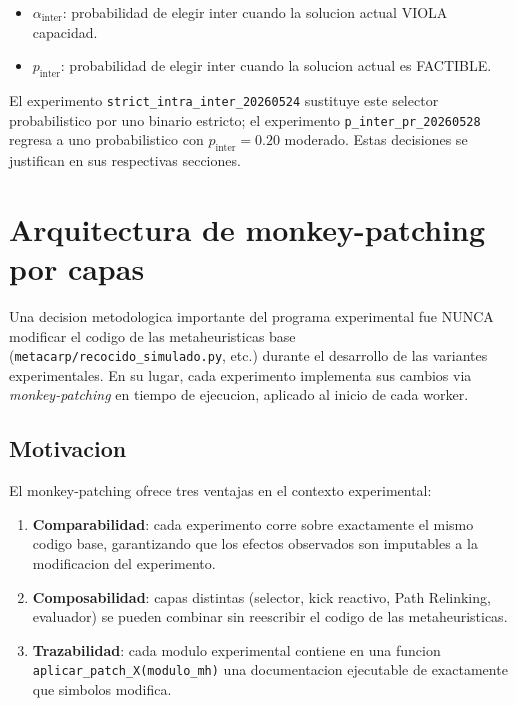 \begin{itemize}
\item $\alpha_{\text{inter}}$: probabilidad de elegir inter cuando la
  solucion actual VIOLA capacidad.
\item $p_{\text{inter}}$: probabilidad de elegir inter cuando la
  solucion actual es FACTIBLE.
\end{itemize}

El experimento \texttt{strict\_intra\_inter\_20260524} sustituye este
selector probabilistico por uno binario estricto; el experimento
\texttt{p\_inter\_pr\_20260528} regresa a uno probabilistico con
$p_{\text{inter}} = 0.20$ moderado. Estas decisiones se justifican en
sus respectivas secciones.

\section{Arquitectura de monkey-patching por capas}
\label{sec:arquitectura-software}

Una decision metodologica importante del programa experimental fue
NUNCA modificar el codigo de las metaheuristicas base
(\texttt{metacarp/recocido\_simulado.py}, etc.) durante el desarrollo
de las variantes experimentales. En su lugar, cada experimento
implementa sus cambios via \emph{monkey-patching} en tiempo de
ejecucion, aplicado al inicio de cada worker.

\subsection{Motivacion}

El monkey-patching ofrece tres ventajas en el contexto experimental:

\begin{enumerate}
\item \textbf{Comparabilidad}: cada experimento corre sobre exactamente
  el mismo codigo base, garantizando que los efectos observados son
  imputables a la modificacion del experimento.
\item \textbf{Composabilidad}: capas distintas (selector, kick reactivo,
  Path Relinking, evaluador) se pueden combinar sin reescribir el
  codigo de las metaheuristicas.
\item \textbf{Trazabilidad}: cada modulo experimental contiene en una
  funcion \texttt{aplicar\_patch\_X(modulo\_mh)} una documentacion
  ejecutable de exactamente que simbolos modifica.
\end{enumerate}

